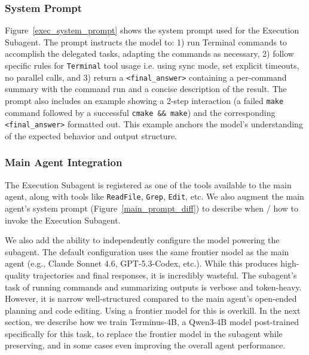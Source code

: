 \documentclass[sigconf,review]{acmart}
\begin{document}
\subsubsection{System Prompt}
Figure~\ref{exec_system_prompt} shows the system prompt used for the Execution Subagent. The prompt instructs the model to: 1) run Terminal commands to accomplish the delegated tasks, adapting the commands as necessary, 2) follow specific rules for \texttt{Terminal} tool usage i.e. using sync mode, set explicit timeouts, no parallel calls, and 3) return a \texttt{<final\_answer>} containing a per-command summary with the command run and a concise description of the result. The prompt also includes an example showing a 2-step interaction (a failed \texttt{make} command followed by a successful \texttt{cmake \&\& make}) and the corresponding \texttt{<final\_answer>} formatted out. This example anchors the model's understanding of the expected behavior and output structure.

\subsubsection{Main Agent Integration}
The Execution Subagent is registered as one of the tools available to the main agent, along with tools like \texttt{ReadFile}, \texttt{Grep}, \texttt{Edit}, etc. We also augment the main agent's system prompt (Figure~\ref{main_prompt_diff}) to describe when / how to invoke the Execution Subagent.

We also add the ability to independently configure the model powering the subagent. The default configuration uses the same frontier model as the main agent (e.g., Claude Sonnet 4.6, GPT-5.3-Codex, etc.). While this produces high-quality trajectories and final responses, it is incredibly wasteful. The subagent's task of running commands and summarizing outputs is verbose and token-heavy. However, it is narrow well-structured compared to the main agent's open-ended planning and code editing. Using a frontier model for this is overkill. In the next section, we describe how we train Terminus-4B, a Qwen3-4B model post-trained specifically for this task, to replace the frontier model in the subagent while preserving, and in some cases even improving the overall agent performance.

\end{document}
